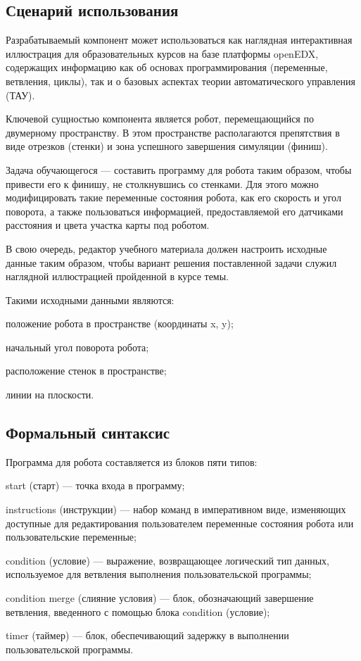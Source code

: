 \subsection{Сценарий использования}

Разрабатываемый компонент может использоваться как наглядная интерактивная иллюстрация для образовательных курсов на базе платформы openEDX, содержащих информацию как об основах программирования (переменные, ветвления, циклы), так и о базовых аспектах теории автоматического управления (ТАУ).

Ключевой сущностью компонента является робот, перемещающийся по двумерному пространству. В этом пространстве располагаются препятствия в виде отрезков (стенки) и зона успешного завершения симуляции (финиш).

Задача обучающегося — составить программу для робота таким образом, чтобы привести его к финишу, не столкнувшись со стенками. Для этого можно модифицировать такие переменные состояния робота, как его скорость и угол поворота, а также пользоваться информацией, предоставляемой его датчиками расстояния и цвета участка карты под роботом.

В свою очередь, редактор учебного материала должен настроить исходные данные таким образом, чтобы вариант решения поставленной задачи служил наглядной иллюстрацией пройденной в курсе темы.

Такими исходными данными являются:

\begin{itemize*}
	\item положение робота в пространстве (координаты x, y);
	\item начальный угол поворота робота;
	\item расположение стенок в пространстве;
	\item линии на плоскости.
\end{itemize*}

\subsection{Формальный синтаксис}
Программа для робота составляется из блоков пяти типов:
\begin{itemize*}
	\item start (старт) — точка входа в программу;
	\item instructions (инструкции) — набор команд в императивном виде, изменяющих доступные для редактирования пользователем переменные состояния робота или пользовательские переменные;
	\item condition (условие) — выражение, возвращающее логический тип данных, используемое для ветвления выполнения пользовательской программы;
	\item condition merge (слияние условия) — блок, обозначающий завершение ветвления, введенного с помощью блока condition (условие);
	\item timer (таймер) — блок, обеспечивающий задержку в выполнении пользовательской программы.
\end{itemize*}

